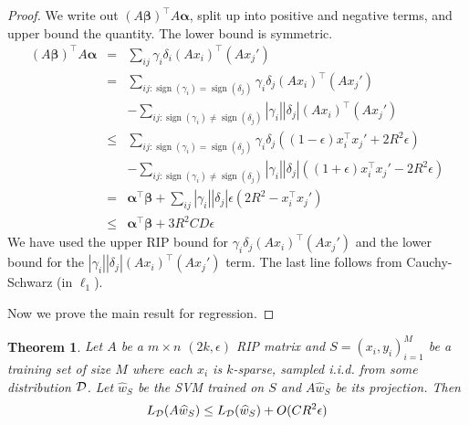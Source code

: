 \documentclass[english]{article}
\theoremstyle{plain}
\newtheorem{theorem}{Theorem}
\DeclareMathOperator{\sign}{sign}
\begin{document}
\begin{proof}
We write out $\left(A\bm{\beta}\right)^{\top}A\bm{\alpha}$, split
up into positive and negative terms, and upper bound the quantity.
The lower bound is symmetric.
\begin{eqnarray*}
\left(A\bm{\beta}\right)^{\top}A\bm{\alpha} & = & \sum_{ij}\gamma_{i}\delta_{i}\left(Ax_{i}\right)^{\top}\left(Ax_{j}'\right)\\
 & = & \sum_{ij:\sign(\gamma_{i})=\sign(\delta_{j})}\gamma_{i}\delta_{j}\left(Ax_{i}\right)^{\top}\left(Ax_{j}'\right)\\
 &  & -\sum_{ij:\sign(\gamma_{i})\neq\sign(\delta_{j})}\left|\gamma_{i}\right|\left|\delta_{j}\right|\left(Ax_{i}\right)^{\top}\left(Ax_{j}'\right)\\
 & \leq & \sum_{ij:\sign(\gamma_{i})=\sign(\delta_{j})}\gamma_{i}\delta_{j}\left((1-\epsilon)x_{i}^{\top}x_{j}'+2R^{2}\epsilon\right)\\
 &  & -\sum_{ij:\sign(\gamma_{i})\neq\sign(\delta_{j})}\left|\gamma_{i}\right|\left|\delta_{j}\right|\left((1+\epsilon)x_{i}^{\top}x_{j}'-2R^{2}\epsilon\right)\\
 & = & \bm{\alpha}^{\top}\bm{\beta}+\sum_{ij}\left|\gamma_{i}\right|\left|\delta_{j}\right|\epsilon\left(2R^{2}-x_{i}^{\top}x_{j}'\right)\\
 & \leq & \bm{\alpha}^{\top}\bm{\beta}+3R^{2}CD\epsilon
\end{eqnarray*}
We have used the upper RIP bound for $\gamma_{i}\delta_{j}\left(Ax_{i}\right)^{\top}\left(Ax_{j}'\right)$
and the lower bound for the $\left|\gamma_{i}\right|\left|\delta_{j}\right|\left(Ax_{i}\right)^{\top}\left(Ax_{j}'\right)$
term. The last line follows from Cauchy-Schwarz (in $\ell_{1}$).

Now we prove the main result for regression.
\end{proof}
\begin{theorem}
Let $A$ be a $m \times n$ $(2k, \epsilon)$ RIP matrix and $S = {(x_i,y_i)_{i=1}^M}$ be a training set of size $M$ where each $x_i$ is $k$-sparse, sampled i.i.d. from some distribution $\cal D$. Let $\widehat{w}_S$ be the SVM trained on $S$ and $A\widehat{w}_S$ be its projection. Then
\[
L_{\cal D}(A\widehat{w}_S) \leq L_{\cal D}(\widehat{w}_S) + O(CR^2 \epsilon)
\]
\end{theorem}
\end{document}
